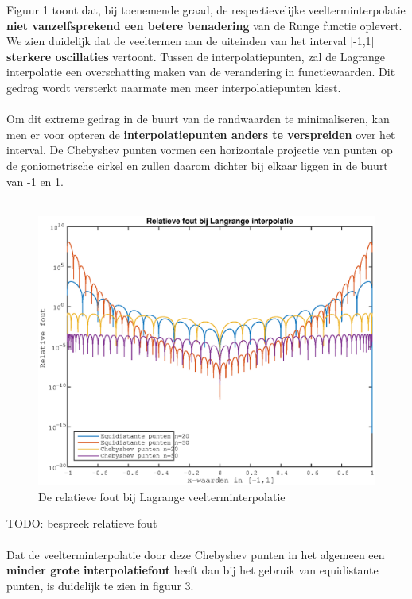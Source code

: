 \documentclass{article}
\begin{document}
Figuur 1 toont dat, bij toenemende graad, de respectievelijke veelterminterpolatie \textbf{niet vanzelfsprekend een betere benadering} van de Runge functie oplevert. We zien duidelijk dat de veeltermen aan de uiteinden van het interval [-1,1] \textbf{sterkere oscillaties} vertoont. Tussen de interpolatiepunten, zal de Lagrange interpolatie een overschatting maken van de verandering in functiewaarden. Dit gedrag wordt versterkt naarmate men meer interpolatiepunten kiest. 
\\  \\
Om dit extreme gedrag in de buurt van de randwaarden te minimaliseren, kan men er voor opteren de \textbf{interpolatiepunten anders te verspreiden} over het interval. De Chebyshev punten vormen een horizontale projectie van punten op de goniometrische cirkel en zullen daarom dichter bij elkaar liggen in de buurt van -1 en 1.  
\\ \\
\begin{center}
\begin{figure}[h!]
\includegraphics[width=0.75\columnwidth]{relatieve_fout}
\caption{De relatieve fout bij Lagrange veelterminterpolatie} %
\end{figure}
\end{center}

TODO: bespreek relatieve fout
\\ \\ 
Dat de veelterminterpolatie door deze Chebyshev punten in het algemeen een \textbf{minder grote interpolatiefout} heeft dan bij het gebruik van equidistante punten, is duidelijk te zien in figuur 3.
\end{document}
